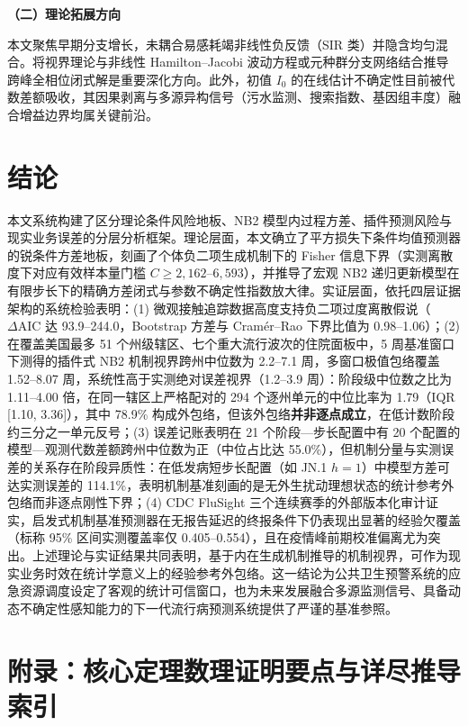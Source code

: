 \documentclass[11pt,a4paper]{article}
\theoremstyle{plain}
\theoremstyle{definition}
\begin{document}
{\noindent\textbf{（二）理论拓展方向}

本文聚焦早期分支增长，未耦合易感耗竭非线性负反馈（SIR 类）并隐含均匀混合。将视界理论与非线性 Hamilton--Jacobi 波动方程或元种群分支网络结合推导跨峰全相位闭式解是重要深化方向\citep{parag2026threshold}。此外，初值 $I_0$ 的在线估计不确定性目前被代数差额吸收，其因果剥离与多源异构信号（污水监测、搜索指数、基因组丰度）融合增益边界均属关键前沿。\par}

\vspace{-2pt}
\section{结论}\label{sec:conclusion}

本文系统构建了区分理论条件风险地板、NB2 模型内过程方差、插件预测风险与现实业务误差的分层分析框架。理论层面，本文确立了平方损失下条件均值预测器的锐条件方差地板，刻画了个体负二项生成机制下的 Fisher 信息下界（实测离散度下对应有效样本量门槛 $C \ge 2{,}162\text{--}6{,}593$），并推导了宏观 NB2 递归更新模型在有限步长下的精确方差闭式与参数不确定性指数放大律。实证层面，依托四层证据架构的系统检验表明：(1) 微观接触追踪数据高度支持负二项过度离散假说（$\Delta\text{AIC}$ 达 93.9--244.0，Bootstrap 方差与 Cramér--Rao 下界比值为 0.98--1.06）；(2) 在覆盖美国最多 51 个州级辖区、七个重大流行波次的住院面板中，5 周基准窗口下测得的插件式 NB2 机制视界跨州中位数为 2.2--7.1 周，多窗口极值包络覆盖 1.52--8.07 周，系统性高于实测绝对误差视界（1.2--3.9 周）：阶段级中位数之比为 1.11--4.00 倍，在同一辖区上严格配对的 294 个逐州单元的中位比率为 1.79（IQR [1.10, 3.36]），其中 78.9\% 构成外包络，但该外包络\textbf{并非逐点成立}，在低计数阶段约三分之一单元反号；(3) 误差记账表明在 21 个阶段—步长配置中有 20 个配置的模型—观测代数差额跨州中位数为正（中位占比达 55.0\%），但机制分量与实测误差的关系存在阶段异质性：在低发病短步长配置（如 JN.1 $h=1$）中模型方差可达实测误差的 114.1\%，表明机制基准刻画的是无外生扰动理想状态的统计参考外包络而非逐点刚性下界；(4) CDC FluSight 三个连续赛季的外部版本化审计证实，启发式机制基准预测器在无报告延迟的终报条件下仍表现出显著的经验欠覆盖（标称 95\% 区间实测覆盖率仅 0.405--0.554），且在疫情峰前期校准偏离尤为突出。上述理论与实证结果共同表明，基于内在生成机制推导的机制视界，可作为现实业务时效在统计学意义上的经验参考外包络。这一结论为公共卫生预警系统的应急资源调度设定了客观的统计可信窗口，也为未来发展融合多源监测信号、具备动态不确定性感知能力的下一代流行病预测系统提供了严谨的基准参照。

\clearpage
\appendix
\section*{附录：核心定理数理证明要点与详尽推导索引}
\end{document}
